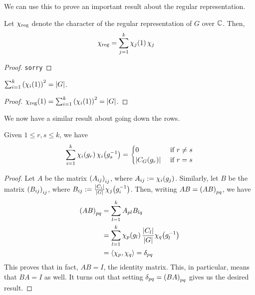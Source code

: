We can use this to prove an important result about the regular representation.

\begin{theorem} \label{Ch2:Thm:Reg_Rep_Col_1}
    Let $\chi_{\operatorname{reg}}$ denote the character of the regular representation of $G$ over $\mathbb{C}$. Then,
    \begin{align*}
        \chi_{\operatorname{reg}} &= \sum_{j=1}^{k} \chi_{j}\!\left( 1 \right) \chi_j
    \end{align*}
\end{theorem}
\begin{proof}
    \verb|sorry|  %
\end{proof}

\begin{corollary} \label{Ch2:Cor:Reg_Rep_Col_1_Grp_Size}
    $\sum_{i=1}^{k} \left( \chi_{i}\!\left( 1 \right) \right)^2 = \left\lvert G \right\rvert$.
\end{corollary}
\begin{proof}
    $\chi_{\operatorname{reg}}\!\left( 1 \right) = \sum_{i=1}^{k} \left( \chi_i(1) \right)^2 = \left\lvert G \right\rvert$.
\end{proof}

We now have a similar result about going down the rows.

\begin{boxproposition}
    Given $1 \leq r, s \leq k$, we have
    \begin{align*}
        \sum_{i=1}^{k} \chi_{i}\!\left( g_r \right) \chi_{i}\!\left( g_s^{-1} \right) =
        \begin{cases}
            0 &\text{ if } r \neq s \\
            \left\lvert C_G(g_r) \right\rvert &\text{ if } r = s
        \end{cases}
    \end{align*}
\end{boxproposition}
\begin{proof}
    Let $A$ be the matrix $\left( A_{ij} \right)_{ij}$, where $A_{ij} := \chi_{i}\!\left( g_j \right)$. Similarly, let $B$ be the matrix $\left( B_{ij} \right)_{ij}$, where $B_{ij} := \frac{\left\lvert C_i \right\rvert}{\left\lvert G \right\rvert} \chi_{j}\!\left( g_i^{-1} \right)$. Then, writing $AB = \left( AB \right)_{pq}$, we have
    \begin{align*}
        \left( AB \right)_{pq} &=
        \sum_{l=1}^{k} A_{pl} B_{lq} \\
        &= \sum_{l=1}^{k} \chi_{p}\!\left( g_l \right) \frac{\left\lvert C_l \right\rvert}{\left\lvert G \right\rvert} \chi_{q}\!\left( g_l^{-1} \right) \\
        &= \left\langle \chi_p, \chi_q \right\rangle = \delta_{pq}
    \end{align*}
    This proves that in fact, $AB = I$, the identity matrix. This, in particular, means that $BA = I$ as well. It turns out that setting $\delta_{pq} = \left( BA \right)_{pq}$ gives us the desired result. %
\end{proof}

